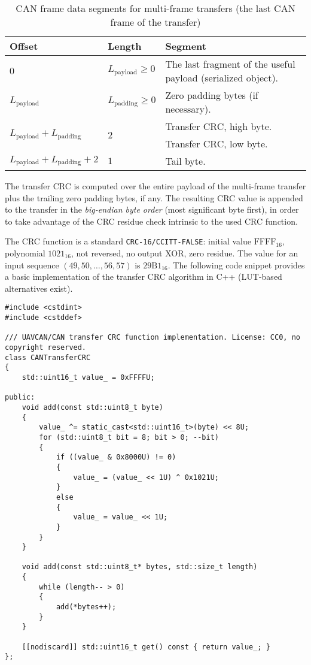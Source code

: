 \begin{table}[H]\caption{CAN frame data segments for multi-frame transfers (the last CAN frame of the transfer)}
\label{table:can_data_segments_multi_frame_last}
\begin{tabu}{|l l X|}
    \hline
    \rowfont{\bfseries}
    Offset                  & Length                     & Segment \\\hline
    $0$                     & $L_\text{payload}\geq{}0$  & The last fragment of the useful payload
                                                           (serialized object). \\\hline
    $L_\text{payload}$      & $L_\text{padding}\geq{}0$  & Zero padding bytes (if necessary). \\\hline

     &  &
                                                           Transfer CRC, high byte.\\
                            &                            & Transfer CRC, low byte.\\\hline

    $L_\text{payload} + L_\text{padding} + 2$ & $1$        & Tail byte. \\\hline
\end{tabu}
\end{table}

The transfer CRC is computed over the entire payload of the multi-frame transfer
plus the trailing zero padding bytes, if any.
The resulting CRC value is appended to the transfer in the \emph{big-endian byte order} (most significant byte first),
in order to take advantage of the CRC residue check intrinsic to the used CRC function.

The CRC function is a standard \verb|CRC-16/CCITT-FALSE|:
initial value $\mathrm{FFFF}_{16}$, polynomial $\mathrm{1021}_{16}$,
not reversed, no output XOR, zero residue.
The value for an input sequence $\left(49, 50, \ldots, 56, 57\right)$ is $\mathrm{29B1}_{16}$.
The following code snippet provides a basic implementation of the transfer CRC algorithm in C++
(LUT-based alternatives exist).

\begin{verbatim}
#include <cstdint>
#include <cstddef>

/// UAVCAN/CAN transfer CRC function implementation. License: CC0, no copyright reserved.
class CANTransferCRC
{
    std::uint16_t value_ = 0xFFFFU;

public:
    void add(const std::uint8_t byte)
    {
        value_ ^= static_cast<std::uint16_t>(byte) << 8U;
        for (std::uint8_t bit = 8; bit > 0; --bit)
        {
            if ((value_ & 0x8000U) != 0)
            {
                value_ = (value_ << 1U) ^ 0x1021U;
            }
            else
            {
                value_ = value_ << 1U;
            }
        }
    }

    void add(const std::uint8_t* bytes, std::size_t length)
    {
        while (length-- > 0)
        {
            add(*bytes++);
        }
    }

    [[nodiscard]] std::uint16_t get() const { return value_; }
};
\end{verbatim}

